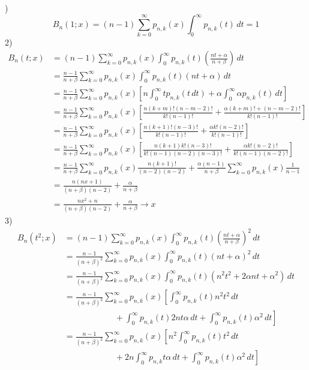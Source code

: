 )
\[
B_n(1; x) = (n-1) \sum_{k=0}^{\infty} p_{n, k}(x) \int_{0}^{\infty} p_{n, k}(t) \, dt = 1
\]
2)
\begin{align*}
	B_n(t; x) &= (n-1) \sum_{k=0}^{\infty} p_{n, k}(x) \int_{0}^{\infty} p_{n, k}(t) \left(\frac{nt+\alpha}{n + \beta}\right)\, dt \\
	&= \frac{n-1}{n+\beta} \sum_{k=0}^{\infty} p_{n, k}(x) \int_{0}^{\infty} p_{n, k}(t) (nt + \alpha) \, dt\\
	&= \frac{n-1}{n+\beta} \sum_{k=0}^{\infty} p_{n, k}(x) \left[n\int_{0}^{\infty} t p_{n, k}(t\, dt) + \alpha \int_{0}^{\infty} \alpha p_{n,k}(t)\, dt\right]\\
	&= \frac{n-1}{n+\beta} \sum_{k=0}^{\infty} p_{n, k}(x) \left[\textstyle
	\frac{n(k+m)!(n-m-2)!}{k!(n-1)!} + \frac{\alpha(k+m)! + (n-m-2)!}{k!(n-1)!}
	\right]\\
	&= \frac{n-1}{n+\beta} \sum_{k=0}^{\infty} p_{n, k}(x) \left[\textstyle
	\frac{n(k+1)! (n-3)!}{k!(n-1)!} + \frac{\alpha k!(n-2)!}{k!(n-1)!}
	\right]\\
	&= \frac{n-1}{n+\beta} \sum_{k=0}^{\infty} p_{n, k}(x) \left[\textstyle
	\frac{n(k+1)k!(n-3)!}{k!(n-1)(n-2)(n-3)!} + \frac{\alpha k! (n-2)!}{k! (n-1)(n-2)!}
	\right]\\
	&= \frac{n-1}{n+\beta} \sum_{k=0}^{\infty} p_{n, k}(x) \frac{n(k+1)!}{(n-2)(n-2)} + \frac{\alpha(n-1)}{n+\beta} \sum_{k=0}^{\infty} p_{n, k}(x) \frac{1}{n-1}\\
	&= \frac{n(nx + 1)}{(n+\beta)(n-2)} + \frac{\alpha}{n + \beta}\\
	&= \frac{nx^2 + n}{(n+\beta)(n-2)} + \frac{\alpha}{n + \beta} \to x
\end{align*}
3)
\begin{align*}
	B_n(t^2; x) &= (n-1) \sum_{k=0}^{\infty} p_{n, k}(x) \int_{0}^{\infty} p_{n, k}(t) \left(\frac{nt+\alpha}{n + \beta}\right)^2\, dt \\
	&= \frac{n-1}{(n+\beta)^2} \sum_{k=0}^{\infty} p_{n, k}(x) \int_{0}^{\infty} p_{n, k}(t) (nt + \alpha)^2 \, dt\\
	&= \frac{n-1}{(n+\beta)^2} \sum_{k=0}^{\infty} p_{n, k}(x) \int_{0}^{\infty} p_{n, k}(t) (n^2t^2 + 2\alpha n t + \alpha^2) \, dt\\
	&= \frac{n-1}{(n+\beta)^2} \sum_{k=0}^{\infty} p_{n, k}(x) \left[
	\int_{0}^{\infty} p_{n, k}(t) n^2 t^2 \, dt 
	\right.\\
	& \qquad\qquad\qquad + \left.\int_{0}^{\infty} p_{n, k}(t) 2 n t \alpha \, dt + \int_{0}^{\infty} p_{n, k}(t) \alpha^2 \, dt \right]\\
	&= \frac{n-1}{(n+\beta)^2} \sum_{k=0}^{\infty} p_{n, k}(x) \left[
	n^2 \int_{0}^{\infty} p_{n, k}(t) t^2 \, dt 
	\right.\\
	& \qquad\qquad\qquad + \left. 2n\int_{0}^{\infty} p_{n, k} t \alpha \, dt + \int_{0}^{\infty} p_{n, k}(t) \alpha^2 \, dt \right]
\end{align*}
